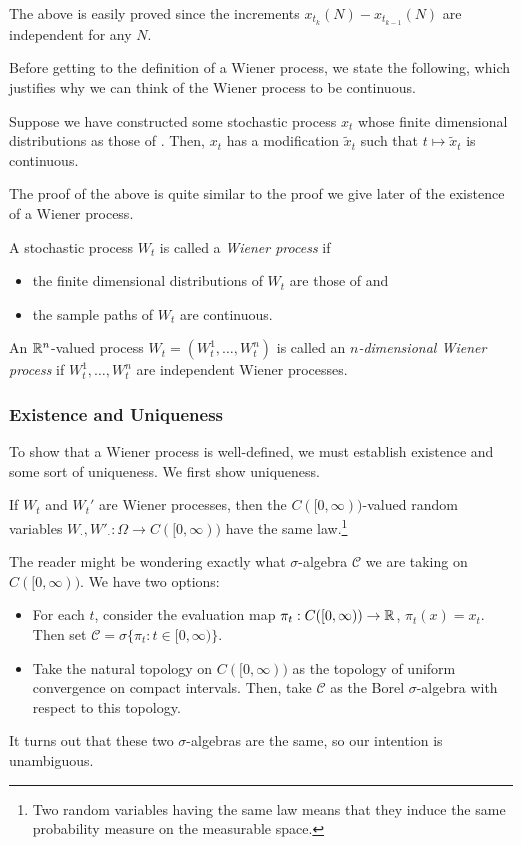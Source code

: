 The above is easily proved since the increments $x_{t_k}(N) - x_{t_{k-1}}(N)$ are independent for any $N$.

Before getting to the definition of a Wiener process, we state the following, which justifies why we can think of the Wiener process to be continuous.

\begin{lemma}
	Suppose we have constructed some stochastic process $x_t$ whose finite dimensional distributions as those of . Then, $x_t$ has a modification $\tilde{x}_t$ such that $t\mapsto\tilde{x}_t$ is continuous.
\end{lemma}

The proof of the above is quite similar to the proof we give later of the existence of a Wiener process.

\begin{fdef}
	\label{def: wiener}
	A stochastic process $W_t$ is called a \textit{Wiener process} if
	\begin{itemize}
		\item the finite dimensional distributions of $W_t$ are those of  and
		\item the sample paths of $W_t$ are continuous.
	\end{itemize}
\end{fdef}

An $\mathbb{R}^n$-valued process $W_t = (W_t^1,\ldots,W_t^n)$ is called an \textit{$n$-dimensional Wiener process} if $W_t^1,\ldots,W_t^n$ are independent Wiener processes.

\subsubsection{Existence and Uniqueness}

To show that a Wiener process is well-defined, we must establish existence and some sort of uniqueness. We first show uniqueness.

\begin{lemma}
	If $W_t$ and $W_t'$ are Wiener processes, then the $C([0,\infty))$-valued random variables $W_{\cdot},W'_{\cdot}:\Omega\to C([0,\infty))$ have the same law.\footnote{Two random variables having the same law means that they induce the same probability measure on the measurable space.}
\end{lemma}

The reader might be wondering exactly what $\sigma$-algebra $\mathcal{C}$ we are taking on $C([0,\infty))$. We have two options:
\begin{itemize}
	\item For each $t$, consider the evaluation map $\pi_t:C([0,\infty))\to\mathbb{R}$, $\pi_t(x)=x_t$. Then set $\mathcal{C}=\sigma\{\pi_t : t\in[0,\infty)\}$.
	\item Take the natural topology on $C([0,\infty))$ as the topology of uniform convergence on compact intervals. Then, take $\mathcal{C}$ as the Borel $\sigma$-algebra with respect to this topology.
\end{itemize}
It turns out that these two $\sigma$-algebras are the same, so our intention is unambiguous.

